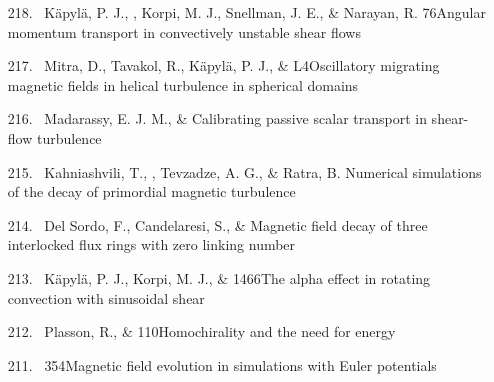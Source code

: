 \begin{itemize}
\item[{218.}~]
K\"apyl\"a, P. J., \Brandenburg, Korpi, M. J., Snellman, J. E., \&
Narayan, R.
{76}{Angular momentum transport in convectively unstable shear flows}

\item[{217.}~]
Mitra, D., Tavakol, R., K\"apyl\"a, P. J., \& \Brandenburg{}
{L4}{Oscillatory migrating magnetic fields in helical turbulence
in spherical domains}

\item[{216.}~]
Madarassy, E. J. M., \& \Brandenburg{}
{Calibrating passive scalar transport in shear-flow turbulence}

\item[{215.}~]
Kahniashvili, T., \Brandenburg, Tevzadze, A. G., \& Ratra, B.
{Numerical simulations of the decay of primordial magnetic turbulence}

\item[{214.}~]
Del Sordo, F., Candelaresi, S., \& \Brandenburg{}
{Magnetic field decay of three interlocked flux rings with zero linking number}

\item[{213.}~]
K\"apyl\"a, P. J., Korpi, M. J., \& \Brandenburg{}
{1466}{The alpha effect in rotating convection with sinusoidal shear}

\item[{212.}~]
Plasson, R., \& \Brandenburg{}
{110}{Homochirality and the need for energy}

\item[{211.}~]
\Brandenburg{}
{354}{Magnetic field evolution in simulations with Euler potentials}


\end{itemize}
